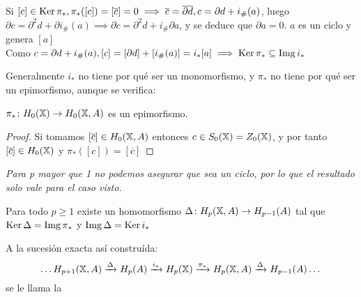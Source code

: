 Si $[c] \in \operatorname{Ker} \pi_*, \pi_*([c]) = [\overline{c}] = 0 \implies \overline{c} = \overline{\partial d}, c = \partial d + i_\#(a)$,
luego $\partial c = \partial^2 d + \partial i_\#(a) \implies \partial c = \partial^2 d + i_\# \partial a$, y se deduce que $\partial a = 0$.
$a$ es un ciclo y genera $[a]$ \\
Como $c = \partial d + i_\#(a), [c] = [\partial d] + [i_\#(a)] = i_*[a] \implies \operatorname{Ker} \pi_* \subseteq \operatorname{Img} i_*$

Generalmente $i_*$ no tiene por qué ser un monomorfismo, y $\pi_*$ no tiene por qué ser un epimorfismo, aunque se verifica:

\begin{proposition}
  $\pi_* \colon H_0({\mathbb X}) \to H_0({\mathbb X}, A)$ es un epimorfismo.
\end{proposition}

\begin{proof}
  Si tomamos $[\overline{c}] \in H_0({\mathbb X}, A)$ entonces $c \in S_0({\mathbb X}) = Z_0({\mathbb X})$, y por tanto $[\overline{c}] \in H_0({\mathbb X})$ y
  $\pi_*([c]) = [\overline{c}]$
\end{proof}

\textit{Para p mayor que 1 no podemos asegurar que sea un ciclo, por lo que el resultado solo vale para el caso visto.}

\begin{proposition}
  Para todo $p \geq 1$ existe un homomorfismo $\Delta \colon H_p({\mathbb X}, A) \to H_{p-1}(A)$ tal que $\operatorname{Ker} \Delta = \operatorname{Img} \pi_*$ y $\operatorname{Img} \Delta = \operatorname{Ker} i_*$

  A la sucesión exacta así construída:
  \[\dots H_{p+1}({\mathbb X}, A) \xrightarrow{\Delta} H_p(A) \xrightarrow{i_*} H_p({\mathbb X}) \xrightarrow{\pi_*} H_p({\mathbb X}, A) \xrightarrow{\Delta} H_{p-1}(A) \dots\]
  se le llama la \underline{}
\end{proposition}

